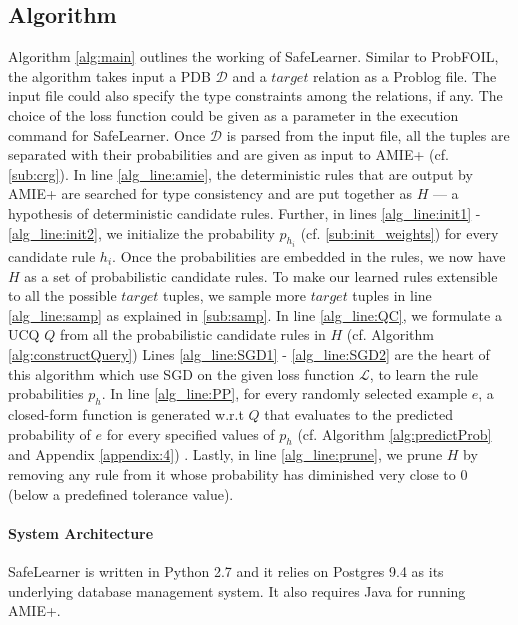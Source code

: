 \documentclass[akbc,twoside,11pt]{article}
\newcounter{example}
\newcommand{\algorithmname}{SafeLearner\xspace}
\begin{document}
\subsection{Algorithm} Algorithm \ref{alg:main} outlines the working of \algorithmname. Similar to ProbFOIL, the algorithm takes input a PDB $\mathcal{D}$ and a $target$ relation as a Problog file. The input file could also specify the type constraints among the relations, if any. The choice of the loss function could be given as a parameter in the execution command for \algorithmname. Once $\mathcal{D}$ is parsed from the input file, all the tuples are separated with their probabilities and are given as input to AMIE+ (cf. \ref{sub:crg}). In line \ref{alg_line:amie}, the deterministic rules that are output by AMIE+ are searched for type consistency and are put together as $H$ --- a hypothesis of deterministic candidate rules. Further, in lines \ref{alg_line:init1} - \ref{alg_line:init2}, we initialize the probability $p_{h_i}$ (cf. \ref{sub:init_weights}) for every candidate rule $h_i$. 
Once the probabilities are embedded in the rules, we now have $H$ as a set of probabilistic candidate rules. 
To make our learned rules extensible to all the possible $target$ tuples, we sample more $target$ tuples in line \ref{alg_line:samp} as explained in \ref{sub:samp}. In line \ref{alg_line:QC}, we formulate a UCQ $Q$ from all the probabilistic candidate rules in $H$ (cf. Algorithm \ref{alg:constructQuery})
Lines \ref{alg_line:SGD1} - \ref{alg_line:SGD2} are the heart of this algorithm which use SGD on the given loss function $\mathcal{L}$, to learn the rule probabilities $p_h$. In line \ref{alg_line:PP}, for every randomly selected example $e$, a closed-form function is generated w.r.t $Q$ that evaluates to the predicted probability of $e$ for every specified values of $p_h$ (cf. Algorithm \ref{alg:predictProb} and Appendix \ref{appendix:4}) . Lastly, in line \ref{alg_line:prune}, we prune $H$ by removing any rule from it whose probability has diminished very close to 0 (below a predefined tolerance value).


\paragraph{System Architecture}
\algorithmname is written in Python 2.7 and it relies on Postgres 9.4 as its underlying database management system. It also requires Java for running AMIE+.
\end{document}
